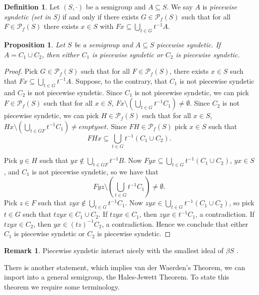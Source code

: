 \documentclass[12pt]{article}
\theoremstyle{plain}
\newtheorem{prop}[thm]{Proposition}
\theoremstyle{definition}
\newtheorem{defn}[thm]{Definition}
\newtheorem{rmk}[thm]{Remark}
\newcommand{\Pf}{\mathcal{P}_f}
\begin{document}
\begin{defn}
  Let $(S, \cdot)$ be a semigroup and $A \subseteq S$.
  We say $A$ is \textsl{piecewise syndetic (set in S)} if and only if there exists $G \in \Pf(S)$ such that for all $F \in \Pf(S)$ there exists $x \in S$ with $Fx \subseteq \bigcup_{t \in G} t^{-1}A$.
\end{defn}

\begin{prop}
  \label{prop:psReg}
  Let $S$ be a semigroup and $A \subseteq S$ piecewise syndetic.
  If $A = C_1 \cup C_2$, then either $C_1$ is piecewise syndetic or $C_2$ is piecewise syndetic.
\end{prop}
\begin{proof}
  Pick $G \in \Pf(S)$ such that for all $F \in \Pf(S)$, there exists $x \in S$ such that $Fx \subseteq \bigcup_{t \in G} t^{-1}A$. 
  Suppose, to the contrary, that $C_1$ is not piecewise syndetic and $C_2$ is not piecewise syndetic. 
  Since $C_1$ is not piecewise syndetic, we can pick $F \in \Pf(S)$ such that for all $x \in S$, $Fx \setminus (\bigcup_{t \in G} t^{-1}C_1) \ne \emptyset$. 
  Since $C_2$ is not piecewise syndetic, we can pick $H \in \Pf(S)$ such that for all $x \in S$, $Hx \setminus (\bigcup_{t \in GF} t^{-1}C_1) \ne emptyset$.
  Since $FH \in \Pf(S)$ pick $x \in S$ such that 
  \[
    FHx \subseteq \bigcup_{t \in G} t^{-1}(C_1 \cup C_2). 
  \]
  
  Pick $y \in H$ such that $yx \not\in \bigcup_{t \in GF} t^{-1}B$. 
  Now $Fyx \subseteq \bigcup_{t \in G} t^{-1}(C_1 \cup C_2)$, $yx \in S$, and $C_1$ is not piecewise syndetic, so we have that 
  \[
    Fyz \setminus (\bigcup_{t \in G} t^{-1}C_1) \ne \emptyset. 
  \]
  Pick $z \in F$ such that $zyx \not\in \bigcup_{t \in G} t^{-1}C_1$. 
  Now $zyx \in \bigcup_{t \in G} t^{-1}(C_1 \cup C_2)$, so pick $t \in G$ such that $tzyx \in C_1 \cup C_2$. 
  If $tzyx \in C_1$, then $zyx \in t^{-1}C_1$, a contradiction.
  If $tzyx \in C_2$, then $yx \in (tz)^{-1}C_2$, a contradiction.
  Hence we conclude that either $C_1$ is piecewise syndetic or $C_2$ is piecewise syndetic.
\end{proof}
\begin{rmk}
  Piecewise syndetic interact nicely with the smallest ideal of $\beta S$ \cite[Theorem 4.40]{Hindman:1998fk}.
\end{rmk}

There is another statement, which implies van der Waerden's Theorem, we can import into a general semigroup, the Hales-Jewett Theorem.
To state this theorem we require some terminology. 
\end{document}
